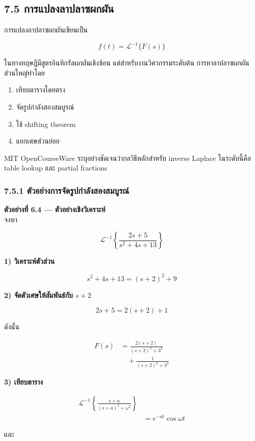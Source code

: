 \subsection{7.5 การแปลงลาปลาซผกผัน}

การแปลงลาปลาซผกผันเขียนเป็น

\[
\boxed{f(t)=\mathcal{L}^{-1}\{F(s)\}}
\]

ในทางทฤษฎีมีสูตรอินทิกรัลผกผันเชิงซ้อน แต่สำหรับงานวิศวกรรมระดับต้น การหาลาปลาซผกผันส่วนใหญ่ทำโดย

\begin{enumerate}
    \item เทียบตารางโดยตรง
    \item จัดรูปกำลังสองสมบูรณ์
    \item ใช้ shifting theorem
    \item แยกเศษส่วนย่อย
\end{enumerate}

MIT OpenCourseWare ระบุอย่างชัดเจนว่ากลวิธีหลักสำหรับ inverse Laplace ในระดับนี้คือ table lookup และ partial fractions

\subsubsection{7.5.1 ตัวอย่างการจัดรูปกำลังสองสมบูรณ์}

\textbf{ตัวอย่างที่ 6.4 — ตัวอย่างเชิงวิเคราะห์}\\
จงหา

\[
\mathcal{L}^{-1}\left\{\frac{2s+5}{s^2+4s+13}\right\}
\]

\textbf{1) วิเคราะห์ตัวส่วน}

\[
s^2+4s+13=(s+2)^2+9
\]

\textbf{2) จัดตัวเศษให้สัมพันธ์กับ $s+2$}

\[
2s+5=2(s+2)+1
\]

ดังนั้น

\[
\begin{aligned}
    F(s)&=\frac{2(s+2)}{(s+2)^2+3^2}\\
    &\quad +\frac{1}{(s+2)^2+3^2}
\end{aligned}
\]

\textbf{3) เทียบตาราง}

\[
\begin{aligned}
    \mathcal{L}^{-1}\left\{\frac{s+a}{(s+a)^2+\omega^2}\right\}&\\
    &=e^{-at}\cos\omega t
\end{aligned}
\]

และ

